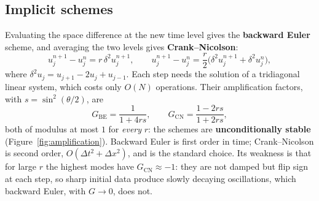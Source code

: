\documentclass[11pt,a4paper]{article}
\numberwithin{equation}{section}
\theoremstyle{definition}
\begin{document}
\subsection{Implicit schemes}
\label{ssec:implicit}

Evaluating the space difference at the new time level gives the \textbf{backward Euler} scheme, and averaging the two levels gives \textbf{Crank--Nicolson}:
\[
u_j^{n + 1} - u_j^n = r\,\delta^2u_j^{n + 1}, \qquad u_j^{n + 1} - u_j^n = \frac r2\bigl(\delta^2u_j^{n + 1} + \delta^2u_j^n\bigr) ,
\]
where $\delta^2u_j = u_{j + 1} - 2u_j + u_{j - 1}$. Each step needs the solution of a tridiagonal linear system, which costs only $O(N)$ operations. Their amplification factors, with $s = \sin^2(\theta/2)$, are
\[
G_{\mathrm{BE}} = \frac1{1 + 4rs}, \qquad G_{\mathrm{CN}} = \frac{1 - 2rs}{1 + 2rs} ,
\]
both of modulus at most $1$ for \emph{every} $r$: the schemes are \textbf{unconditionally stable} (Figure~\ref{fig:amplification}). Backward Euler is first order in time; Crank--Nicolson is second order, $O(\Delta t^2 + \Delta x^2)$, and is the standard choice. Its weakness is that for large $r$ the highest modes have
$G_{\mathrm{CN}} \approx -1$: they are not damped but flip sign at each step, so sharp initial data produce slowly decaying oscillations, which backward Euler, with $G \to 0$, does not.
\end{document}
